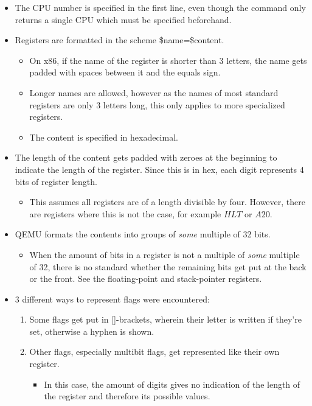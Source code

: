 \begin{itemize}
  \item The CPU number is specified in the first line, even though the command only returns a single CPU which must be specified beforehand.
  \item Registers are formatted in the scheme \$name=\$content.
  \begin{itemize}
    \item On x86, if the name of the register is shorter than 3 letters, the name gets padded with spaces between it and the equals sign.
    \item Longer names are allowed, however as the names of most standard registers are only 3 letters long, this only applies to more specialized registers.
    \item The content is specified in hexadecimal.
  \end{itemize}
  \item The length of the content gets padded with zeroes at the beginning to indicate the length of the register.
  Since this is in hex, each digit represents 4 bits of register length.
  \begin{itemize}
    \item This assumes all registers are of a length divisible by four.
    However, there are registers where this is not the case, for example $HLT$ or $A20$.
  \end{itemize}
  \item QEMU formats the contents into groups of \emph{some} multiple of 32 bits.
  \begin{itemize}
    \item When the amount of bits in a register is not a multiple of \emph{some} multiple of 32,
    there is no standard whether the remaining bits get put at the back or the front.
    See the floating-point and stack-pointer registers.
  \end{itemize}
  \item 3 different ways to represent flags were encountered:
  \begin{enumerate}
    \item Some flags get put in []-brackets, wherein their letter is written if they're set, otherwise a hyphen is shown.
    \item Other flags, especially multibit flags, get represented like their own register.
    \begin{itemize}
      \item In this case, the amount of digits gives no indication of the length of the register and therefore its possible values.

\end{itemize}
\end{enumerate}
\end{itemize}
